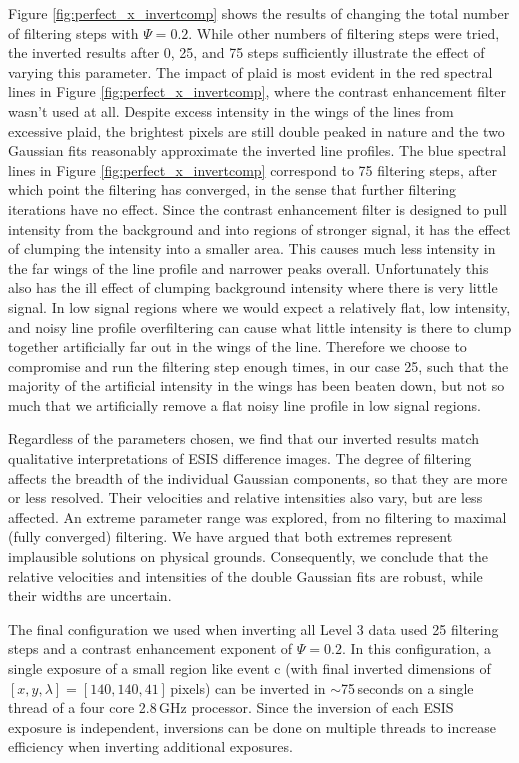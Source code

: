 Figure \ref{fig:perfect_x_invertcomp} shows the results of changing the total number of filtering steps with $\Psi=0.2$.
While other numbers of filtering steps were tried, the inverted results after 0, 25, and 75 steps sufficiently illustrate the effect of varying this parameter. 
The impact of plaid is most evident in the red spectral lines in Figure \ref{fig:perfect_x_invertcomp}, where the contrast enhancement filter wasn't used at all.
Despite excess intensity in the wings of the lines from excessive plaid, the brightest pixels are still double peaked in nature and the two Gaussian fits reasonably approximate the inverted line profiles.
The blue spectral lines in Figure \ref{fig:perfect_x_invertcomp} correspond to 75 filtering steps, after which point the filtering has converged, in the sense that further filtering iterations have no effect.
Since the contrast enhancement filter is designed to pull intensity from the background and into regions of stronger signal, it has the effect of clumping the intensity into a smaller area.
This causes much less intensity in the far wings of the line profile and narrower peaks overall.  
Unfortunately this also has the ill effect of clumping background intensity where there is very little signal.
In low signal regions where we would expect a relatively flat, low intensity, and noisy line profile overfiltering can cause what little intensity is there to clump together artificially far out in the wings of the line.
Therefore we choose to compromise and run the filtering step enough times, in our case 25, such that the majority of the artificial intensity in the wings has been beaten down, but not so much that we artificially remove a flat noisy line profile in low signal regions. 

Regardless of the parameters chosen, we find that our inverted results match qualitative interpretations of ESIS difference images.
The degree of filtering affects the breadth of the individual Gaussian components, so that they are more or less resolved. 
Their velocities and relative intensities also vary, but are less affected. 
An extreme parameter range was explored, from no filtering to maximal (fully converged) filtering. 
We have argued that both extremes represent implausible solutions on physical grounds. Consequently, we conclude that the relative velocities and intensities of the double Gaussian fits are robust, while their widths are uncertain. 

The final configuration we used when inverting all Level 3 data used 25 filtering steps and a contrast enhancement exponent of $\Psi=0.2$.
In this configuration, a single exposure of a small region like event c (with final inverted dimensions of $[x,y,\lambda] = [140,140,41]$\,pixels) can be inverted in $\sim$75\,seconds on a single thread of a four core 2.8\,GHz processor.
Since the inversion of each ESIS exposure is independent, inversions can be done on multiple threads to increase efficiency when inverting additional exposures.